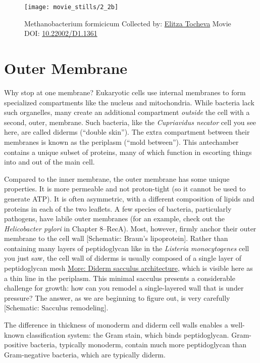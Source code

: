 \documentclass[]{tufte-book}
\begin{document}
\begin{figure}
\texttt{[image: movie\_stills/2\_2b]} \caption[Methanobacterium formicicum Collected by:
\protect\hyperlink{elitza_tocheva}{Elitza Tocheva} Movie DOI:
\href{https://doi.org/10.22002/D1.1361}{10.22002/D1.1361}]{Methanobacterium formicicum Collected by:
\protect\hyperlink{elitza_tocheva}{Elitza Tocheva} Movie DOI:
\href{https://doi.org/10.22002/D1.1361}{10.22002/D1.1361}}\label{fig:2-2b}
\end{figure}

\section{Outer Membrane}\label{outer-membrane}

Why stop at one membrane? Eukaryotic cells use internal membranes to
form specialized compartments like the nucleus and mitochondria. While
bacteria lack such organelles, many create an additional compartment
\emph{outside} the cell with a second, outer, membrane. Such bacteria,
like the \emph{Cupriavidus necator} cell you see here, are called
diderms (``double skin''). The extra compartment between their membranes
is known as the periplasm (``mold between''). This antechamber contains
a unique subset of proteins, many of which function in escorting things
into and out of the main cell.

Compared to the inner membrane, the outer membrane has some unique
properties. It is more permeable and not proton-tight (so it cannot be
used to generate ATP). It is often asymmetric, with a different
composition of lipids and proteins in each of the two leaflets. A few
species of bacteria, particularly pathogens, have labile outer membranes
(for an example, check out the \emph{Helicobacter pylori} in Chapter
8--RecA). Most, however, firmly anchor their outer membrane to the cell
wall {[}Schematic: Braun's lipoprotein{]}. Rather than containing many
layers of peptidoglycan like in the \emph{Listeria monocytogenes} cell
you just saw, the cell wall of diderms is usually composed of a single
layer of peptidoglycan mesh
\protect\hyperlink{Diderm_sacculus_architecture}{More: Diderm sacculus
architecture}, which is visible here as a thin line in the periplasm.
This minimal sacculus presents a considerable challenge for growth: how
can you remodel a single-layered wall that is under pressure? The
answer, as we are beginning to figure out, is very carefully
{[}Schematic: Sacculus remodeling{]}.

The difference in thickness of monoderm and diderm cell walls enables a
well-known classification system: the Gram stain, which binds
peptidoglycan. Gram-positive bacteria, typically monoderm, contain much
more peptidoglycan than Gram-negative bacteria, which are typically
diderm.
\end{document}
